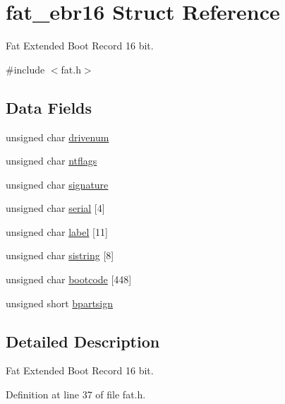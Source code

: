 \hypertarget{a00057}{}\section{fat\+\_\+ebr16 Struct Reference}
\label{a00057}


Fat Extended Boot Record 16 bit.  




{\ttfamily \#include $<$fat.\+h$>$}

\subsection*{Data Fields}
\begin{DoxyCompactItemize}
\item 
unsigned char \hyperlink{a00057_ab9688e94858a4b8df6d7d1c937df5d6c_ab9688e94858a4b8df6d7d1c937df5d6c}{drivenum}
\item 
unsigned char \hyperlink{a00057_a90f6b7d2156bc0f3d709e82c08a1cad4_a90f6b7d2156bc0f3d709e82c08a1cad4}{ntflags}
\item 
unsigned char \hyperlink{a00057_a366424b6b0e4cc2cc3a48fb291cdddf1_a366424b6b0e4cc2cc3a48fb291cdddf1}{signature}
\item 
unsigned char \hyperlink{a00057_a9f3f3907a47eab25db8ffaacf339848f_a9f3f3907a47eab25db8ffaacf339848f}{serial} \mbox{[}4\mbox{]}
\item 
unsigned char \hyperlink{a00057_ab9e42cf63e22b01e07ce6755d66ed8f3_ab9e42cf63e22b01e07ce6755d66ed8f3}{label} \mbox{[}11\mbox{]}
\item 
unsigned char \hyperlink{a00057_a1008703850aab97e1aa8ae5ea8511ab1_a1008703850aab97e1aa8ae5ea8511ab1}{sistring} \mbox{[}8\mbox{]}
\item 
unsigned char \hyperlink{a00057_af996668104b02930035855902e5c842b_af996668104b02930035855902e5c842b}{bootcode} \mbox{[}448\mbox{]}
\item 
unsigned short \hyperlink{a00057_a810bdda9447bbe4dc1ce2f232d18ee30_a810bdda9447bbe4dc1ce2f232d18ee30}{bpartsign}
\end{DoxyCompactItemize}


\subsection{Detailed Description}
Fat Extended Boot Record 16 bit. 

Definition at line 37 of file fat.\+h.



